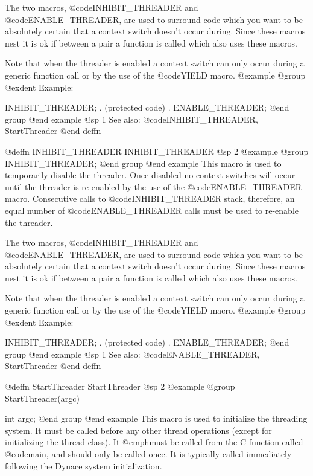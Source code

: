 The two macros, @code{INHIBIT_THREADER} and @code{ENABLE_THREADER},
are used to surround code which you want to be absolutely certain
that a context switch doesn't occur during.  Since these macros nest
it is ok if between a pair a function is called which also uses these
macros.

Note that when the threader is enabled a context switch can only occur
during a generic function call or by the use of the @code{YIELD}
macro.
@example
@group
@exdent Example:

INHIBIT_THREADER;
       .
  (protected code)
       .
ENABLE_THREADER;
@end group
@end example
@sp 1
See also:  @code{INHIBIT_THREADER, StartThreader}
@end deffn


















@deffn {INHIBIT_THREADER} INHIBIT_THREADER
@sp 2
@example
@group
INHIBIT_THREADER;
@end group
@end example
This macro is used to temporarily disable the threader.  Once disabled
no context switches will occur until the threader is re-enabled by the
use of the @code{ENABLE_THREADER} macro.  Consecutive calls to
@code{INHIBIT_THREADER} stack, therefore, an equal number of
@code{ENABLE_THREADER} calls must be used to re-enable the threader.

The two macros, @code{INHIBIT_THREADER} and @code{ENABLE_THREADER},
are used to surround code which you want to be absolutely certain
that a context switch doesn't occur during.  Since these macros nest
it is ok if between a pair a function is called which also uses these
macros.

Note that when the threader is enabled a context switch can only occur
during a generic function call or by the use of the @code{YIELD}
macro.
@example
@group
@exdent Example:

INHIBIT_THREADER;
       .
  (protected code)
       .
ENABLE_THREADER;
@end group
@end example
@sp 1
See also:  @code{ENABLE_THREADER, StartThreader}
@end deffn








@deffn {StartThreader} StartThreader
@sp 2
@example
@group
StartThreader(argc)

int     argc;
@end group
@end example
This macro is used to initialize the threading system.  It must be
called before any other thread operations (except for initializing the
thread class).  It @emph{must} be called from the C function called
@code{main}, and should only be called once.  It is typically
called immediately following the Dynace system initialization.

